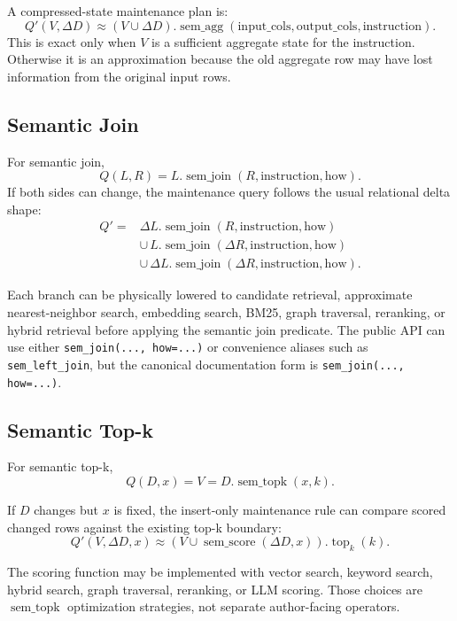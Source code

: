 \documentclass[11pt]{article}
\newcommand{\D}{D}
\newcommand{\V}{V}
\newcommand{\Q}{Q}
\newcommand{\DQ}{Q'}
\newcommand{\DeltaD}{\Delta D}
\newcommand{\SemAgg}{\operatorname{sem\_agg}}
\newcommand{\SemTopK}{\operatorname{sem\_topk}}
\newcommand{\SemJoin}{\operatorname{sem\_join}}
\newcommand{\SemScore}{\operatorname{sem\_score}}
\begin{document}
A compressed-state maintenance plan is:
\[
  \DQ(\V,\DeltaD)
  \approx
  (\V \cup \DeltaD).\SemAgg(\mathrm{input\_cols},\mathrm{output\_cols},
  \mathrm{instruction}).
\]
This is exact only when \(\V\) is a sufficient aggregate state for the
instruction. Otherwise it is an approximation because the old aggregate row may
have lost information from the original input rows.

\subsection{Semantic Join}

For semantic join,
\[
  \Q(L,R) = L.\SemJoin(R,\mathrm{instruction},\mathrm{how}).
\]
If both sides can change, the maintenance query follows the usual relational
delta shape:
\[
\begin{aligned}
  \DQ
  ={}&
  \Delta L.\SemJoin(R,\mathrm{instruction},\mathrm{how}) \\
  &\cup\,
  L.\SemJoin(\Delta R,\mathrm{instruction},\mathrm{how}) \\
  &\cup\,
  \Delta L.\SemJoin(\Delta R,\mathrm{instruction},\mathrm{how}).
\end{aligned}
\]

Each branch can be physically lowered to candidate retrieval, approximate
nearest-neighbor search, embedding search, BM25, graph traversal, reranking, or
hybrid retrieval before applying the semantic join predicate. The public API can
use either \texttt{sem\_join(..., how=...)} or convenience aliases such as
\texttt{sem\_left\_join}, but the canonical documentation form is
\texttt{sem\_join(..., how=...)}.

\subsection{Semantic Top-k}

For semantic top-k,
\[
  \Q(\D,x) = \V = \D.\SemTopK(x,k).
\]

If \(\D\) changes but \(x\) is fixed, the insert-only maintenance rule can
compare scored changed rows against the existing top-k boundary:
\[
  \DQ(\V,\DeltaD,x)
  \approx
  (\V \cup \SemScore(\DeltaD,x)).\operatorname{top}_k(k).
\]

The scoring function may be implemented with vector search, keyword search,
hybrid search, graph traversal, reranking, or LLM scoring. Those choices are
\(\SemTopK\) optimization strategies, not separate author-facing operators.
\end{document}
